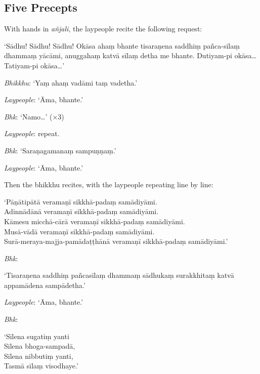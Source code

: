 \subsection{Five Precepts}

With hands in \emph{añjali}, the laypeople recite the following request:

‘Sādhu! Sādhu! Sādhu! Okāsa ahaṃ bhante tisaraṇena saddhiṃ pañca-sīlaṃ dhammaṃ
yācāmi, anuggahaṃ katvā sīlaṃ detha me bhante. Dutiyam-pi okāsa… Tatiyam-pi
okāsa…’

\emph{Bhikkhu}: ‘Yaṃ ahaṃ vadāmi taṃ vadetha.’

\emph{Laypeople}: ‘Āma, bhante.’

\emph{Bhk}: ‘Namo…’ (×3)

\emph{Laypeople}: repeat.

\emph{Bhk}: ‘Saraṇagamanaṃ sampuṇṇaṃ.’

\emph{Laypeople}: ‘Āma, bhante.’

Then the bhikkhu recites, with the laypeople repeating line by line:

‘Pāṇātipātā veramaṇī sikkhā-padaṃ samādiyāmi.\\
Adinnādānā veramaṇī sikkhā-padaṃ samādiyāmi.\\
Kāmesu micchā-cārā veramaṇī sikkhā-padaṃ samādiyāmi.\\
Musā-vādā veramaṇī sikkhā-padaṃ samādiyāmi.\\
Surā-meraya-majja-pamādaṭṭhānā veramaṇī sikkhā-padaṃ samādiyāmi.’


\emph{Bhk}:

‘Tisaraṇena saddhiṃ pañcasīlaṃ dhammaṃ sādhukaṃ surakkhitaṃ katvā appamādena
sampādetha.’

\emph{Laypeople}: ‘Āma, bhante.’

\emph{Bhk}:

‘Sīlena sugatiṃ yanti\\
Sīlena bhoga-sampadā,\\
Sīlena nibbutiṃ yanti,\\
Tasmā sīlaṃ visodhaye.’


